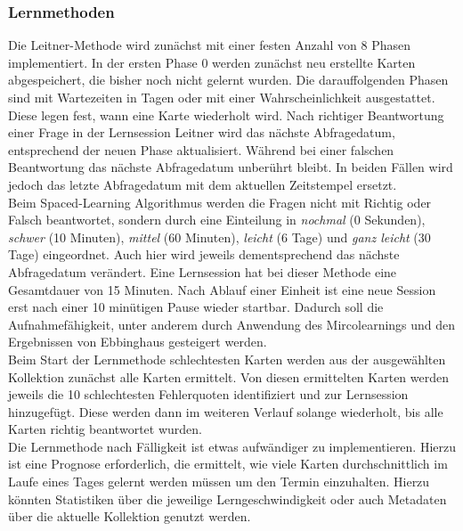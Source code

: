 \subsubsection{Lernmethoden}
Die Leitner-Methode wird zunächst mit einer festen Anzahl von 8 Phasen implementiert. In der ersten Phase 0 werden zunächst neu erstellte Karten abgespeichert, die bisher noch nicht gelernt wurden. Die darauffolgenden Phasen sind mit Wartezeiten in Tagen oder mit einer Wahrscheinlichkeit ausgestattet. Diese legen fest, wann eine Karte wiederholt wird. Nach richtiger Beantwortung einer Frage in der Lernsession \glqq Leitner\grqq{}
 wird das nächste Abfragedatum, entsprechend der neuen Phase aktualisiert. Während bei einer falschen Beantwortung das nächste Abfragedatum unberührt bleibt. In beiden Fällen wird jedoch das letzte Abfragedatum mit dem aktuellen Zeitstempel ersetzt. \\

Beim Spaced-Learning Algorithmus werden die Fragen nicht mit \glqq Richtig\grqq{} oder \glqq Falsch\grqq{} beantwortet, sondern durch eine Einteilung in \emph{nochmal} (0 Sekunden), \emph{schwer} (10 Minuten), \emph{mittel} (60 Minuten), \emph{leicht} (6 Tage) und \emph{ganz leicht} (30 Tage) eingeordnet. Auch hier wird jeweils dementsprechend das nächste Abfragedatum verändert. 
Eine Lernsession hat bei dieser Methode eine Gesamtdauer von 15 Minuten. Nach Ablauf einer Einheit ist eine neue Session erst nach einer 10 minütigen Pause wieder startbar. Dadurch soll die Aufnahmefähigkeit, unter anderem durch Anwendung des Mircolearnings und den Ergebnissen von Ebbinghaus gesteigert werden. \\

Beim Start der Lernmethode \glqq{}schlechtesten Karten\grqq{} werden aus der ausgewählten Kollektion zunächst alle Karten ermittelt. Von diesen ermittelten Karten werden jeweils die 10 schlechtesten Fehlerquoten identifiziert und zur Lernsession hinzugefügt. Diese werden dann im weiteren Verlauf solange wiederholt, bis alle Karten richtig beantwortet wurden. \\

Die Lernmethode \glqq{}nach Fälligkeit\grqq{} ist etwas aufwändiger zu implementieren. Hierzu ist eine Prognose erforderlich, die ermittelt, wie viele Karten durchschnittlich im Laufe eines Tages gelernt werden müssen um den Termin einzuhalten. Hierzu könnten Statistiken über die jeweilige Lerngeschwindigkeit oder auch Metadaten über die aktuelle Kollektion genutzt werden. \\

